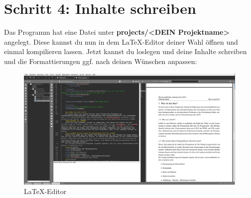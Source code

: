\documentclass[12pt]{article}
\begin{document}
\section{Schritt 4: Inhalte schreiben}
Das Programm hat eine Datei unter \textbf{projects/<DEIN Projektname>} angelegt. Diese kannst du nun in dem LaTeX-Editor deiner Wahl öffnen und einmal kompilieren lassen. Jetzt kannst du loslegen und deine Inhalte schreiben und die Formattierungen ggf. nach deinen Wünschen anpassen:
\FloatBarrier
\begin{figure}[!ht]
\includegraphics[width=.9\textwidth]{images/screenshot_4.png}
\caption{LaTeX-Editor}
\end{figure}
\FloatBarrier
\end{document}
